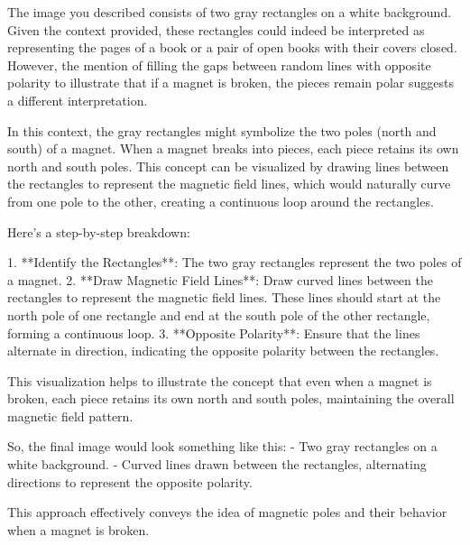 The image you described consists of two gray rectangles on a white background. Given the context provided, these rectangles could indeed be interpreted as representing the pages of a book or a pair of open books with their covers closed. However, the mention of filling the gaps between random lines with opposite polarity to illustrate that if a magnet is broken, the pieces remain polar suggests a different interpretation.

In this context, the gray rectangles might symbolize the two poles (north and south) of a magnet. When a magnet breaks into pieces, each piece retains its own north and south poles. This concept can be visualized by drawing lines between the rectangles to represent the magnetic field lines, which would naturally curve from one pole to the other, creating a continuous loop around the rectangles.

Here's a step-by-step breakdown:

1. **Identify the Rectangles**: The two gray rectangles represent the two poles of a magnet.
2. **Draw Magnetic Field Lines**: Draw curved lines between the rectangles to represent the magnetic field lines. These lines should start at the north pole of one rectangle and end at the south pole of the other rectangle, forming a continuous loop.
3. **Opposite Polarity**: Ensure that the lines alternate in direction, indicating the opposite polarity between the rectangles.

This visualization helps to illustrate the concept that even when a magnet is broken, each piece retains its own north and south poles, maintaining the overall magnetic field pattern.

So, the final image would look something like this:
- Two gray rectangles on a white background.
- Curved lines drawn between the rectangles, alternating directions to represent the opposite polarity.

This approach effectively conveys the idea of magnetic poles and their behavior when a magnet is broken.